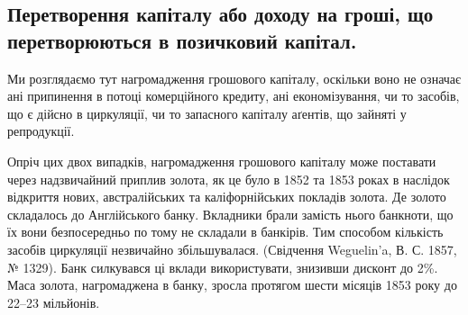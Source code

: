 \subsection{Перетворення капіталу або доходу на гроші, що перетворюються
в позичковий капітал.}

Ми розглядаємо тут нагромадження грошового капіталу, оскільки воно не
означає ані припинення в потоці комерційного кредиту, ані економізування, чи
то засобів, що є дійсно в циркуляції, чи то запасного капіталу аґентів, що зайняті
у репродукції.

Опріч цих двох випадків, нагромадження грошового капіталу може поставати
через надзвичайний приплив золота, як це було в 1852 та 1853 роках
в наслідок відкриття нових, австралійських та каліфорнійських покладів золота.
Де золото складалось до Англійського банку. Вкладники брали замість нього
банкноти, що їх вони безпосередньо по тому не складали в банкірів. Тим способом
кількість засобів циркуляції незвичайно збільшувалася. (Свідчення Weguelin’a,
В. С. 1857, № 1329). Банк силкувався ці вклади використувати, знизивши
дисконт до 2\%. Маса золота, нагромаджена в банку, зросла протягом
шести місяців 1853 року до 22--23 мільйонів.
